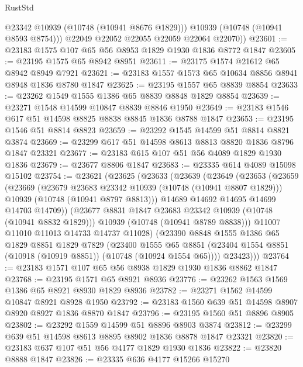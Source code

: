 \begin{lexlean}{RustStd}
\begin{coremodule}
            @23342
            @10939
            (@10748 (@10941 @8676 @1829)))
          @10939
          (@10748 (@10941 @8593 @8754)))
        @22049
        @22052
        @22055
        @22059
        @22064
        @22070))
@23601 := @23183 @1575 @107 @65 @56 @8953 @1829 @1930 @1836 @8772 @1847
@23605 := @23195 @1575 @65 @8942 @8951
@23611 := @23175 @1574 @21612 @65 @8942 @8949 @7921
@23621 := @23183 @1557 @1573 @65 @10634 @8856 @8941 @8948 @1836 @8780 @1847
@23625 := @23195 @1557 @65 @8839 @8854
@23633 := @23262 @1549 @1555 @1386 @65 @8839 @8848 @1829 @8854
@23639 := @23271 @1548 @14599 @10847 @8839 @8846 @1950
@23649 := @23183 @1546 @617 @51 @14598 @8825 @8838 @8845 @1836 @8788 @1847
@23653 := @23195 @1546 @51 @8814 @8823
@23659 := @23292 @1545 @14599 @51 @8814 @8821 @3874
@23669 := @23299 @617 @51 @14598 @8613 @8813 @8820 @1836 @8796 @1847 @23321
@23677 := @23183 @615 @107 @51 @56 @4089 @1829 @1930 @1836
@23679 := @23677 @8806 @1847
@23683 := @23335 @614 @4089 @15098 @15102
@23754 := @23621
    (@23625
      (@23633
        (@23639
          (@23649
            (@23653
              (@23659
                (@23669
                  (@23679 @23683 @23342 @10939 (@10748 (@10941 @8807 @1829)))
                  @10939
                  (@10748 (@10941 @8797 @8813)))
                @14689
                @14692
                @14695
                @14699
                @14703
                @14709))
            (@23677 @8831 @1847 @23683 @23342 @10939 (@10748 (@10941 @8832 @1829)))
            @10939
            (@10748 (@10941 @8789 @8838)))
          @11007
          @11010
          @11013
          @14733
          @14737
          @11028)
        (@23390
          @8848
          @1555
          @1386
          @65
          @1829
          @8851
          @1829
          @7829
          (@23400
            @1555
            @65
            @8851
            (@23404 @1554 @8851 (@10918 (@10919 @8851)) (@10748 (@10924 @1554 @65))))
          @23423)))
@23764 := @23183 @1571 @107 @65 @56 @8938 @1829 @1930 @1836 @8862 @1847
@23768 := @23195 @1571 @65 @8921 @8936
@23776 := @23262 @1563 @1569 @1386 @65 @8921 @8930 @1829 @8936
@23782 := @23271 @1562 @14599 @10847 @8921 @8928 @1950
@23792 := @23183 @1560 @639 @51 @14598 @8907 @8920 @8927 @1836 @8870 @1847
@23796 := @23195 @1560 @51 @8896 @8905
@23802 := @23292 @1559 @14599 @51 @8896 @8903 @3874
@23812 := @23299 @639 @51 @14598 @8613 @8895 @8902 @1836 @8878 @1847 @23321
@23820 := @23183 @637 @107 @51 @56 @4177 @1829 @1930 @1836
@23822 := @23820 @8888 @1847
@23826 := @23335 @636 @4177 @15266 @15270

\end{coremodule}
\end{lexlean}
